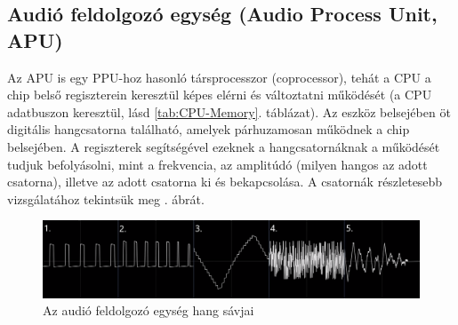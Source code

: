 	\subsection{Audió feldolgozó egység (Audio Process Unit, APU)}
	
	Az APU is egy PPU-hoz hasonló társprocesszor (coprocessor), tehát a CPU a chip belső regiszterein keresztül képes elérni és változtatni működését (a CPU adatbuszon keresztül, lásd \ref{tab:CPU-Memory}. táblázat). Az eszköz belsejében öt digitális hangcsatorna található, amelyek párhuzamosan működnek a chip belsejében. A regiszterek segítségével ezeknek a hangcsatornáknak a működését tudjuk befolyásolni, mint a frekvencia, az amplitúdó (milyen hangos az adott csatorna), illetve az adott csatorna ki és bekapcsolása. A csatornák részletesebb vizsgálatához tekintsük meg . ábrát.
	
	\begin{figure}[H]
		\centering
		\includegraphics[width=150mm, keepaspectratio]{figures/APU-sound-channel-num}
		\caption{Az audió feldolgozó egység hang sávjai \cite{NES_APU_channels}}
		\label{fig:APU-5-sound-channel}
	\end{figure} 
	
